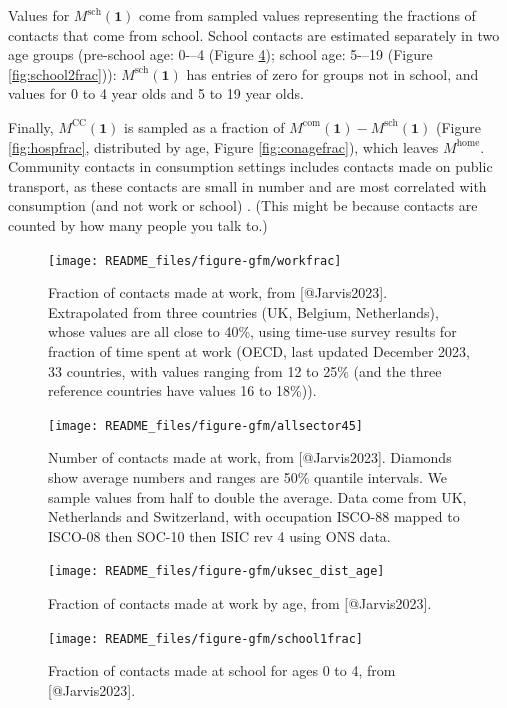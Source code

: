 \documentclass[
]{article}
\begin{document}
Values for \(M^{\text{sch}}(\textbf{1})\) come from sampled values representing the fractions of contacts that come from school. School contacts are estimated separately in two age groups (pre-school age: 0-\/--4 (Figure \ref{fig:school1frac}); school age: 5-\/--19 (Figure \ref{fig:school2frac})): \(M^{\text{sch}}(\textbf{1})\) has entries of zero for groups not in school, and values for 0 to 4 year olds and 5 to 19 year olds.

Finally, \(M^{\text{CC}}(\textbf{1})\) is sampled as a fraction of \(M^{\text{com}}(\textbf{1})- M^{\text{sch}}(\textbf{1})\) (Figure \ref{fig:hospfrac}, distributed by age, Figure \ref{fig:conagefrac}), which leaves \(M^{\text{home}}\). Community contacts in consumption settings includes contacts made on public transport, as these contacts are small in number and are most correlated with consumption (and not work or school) \citep{Jarvis2023}. (This might be because contacts are counted by how many people you talk to.)

\begin{figure}
\texttt{[image: README\_files/figure-gfm/workfrac]} \caption{Fraction of contacts made at work, from [@Jarvis2023]. Extrapolated from three countries (UK, Belgium, Netherlands), whose values are all close to 40\%, using time-use survey results for fraction of time spent at work (OECD, last updated December 2023, 33 countries, with values ranging from 12 to 25\% (and the three reference countries have values 16 to 18\%)).}\label{fig:workfrac}
\end{figure}

\begin{figure}
\texttt{[image: README\_files/figure-gfm/allsector45]} \caption{Number of contacts made at work, from [@Jarvis2023]. Diamonds show average numbers and ranges are 50\% quantile intervals. We sample values from half to double the average. Data come from UK, Netherlands and Switzerland, with occupation ISCO-88 mapped to ISCO-08 then SOC-10 then ISIC rev 4 using ONS data.}\label{fig:allsector}
\end{figure}

\begin{figure}
\texttt{[image: README\_files/figure-gfm/uksec\_dist\_age]} \caption{Fraction of contacts made at work by age, from [@Jarvis2023].}\label{fig:uksecdistage}
\end{figure}

\begin{figure}
\texttt{[image: README\_files/figure-gfm/school1frac]} \caption{Fraction of contacts made at school for ages 0 to 4, from [@Jarvis2023].}\label{fig:school1frac}
\end{figure}
\end{document}
